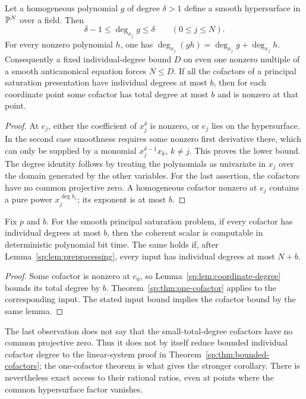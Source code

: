\begin{lemma}
\label{sp:lem:coordinate-degree}
Let a homogeneous polynomial $g$ of degree $\delta>1$ define a smooth
hypersurface in $\mathbb P^N$ over a field. Then
\[
 \delta-1\leq\deg_{x_j}g\leq\delta\qquad(0\leq j\leq N).
\]
For every nonzero polynomial $h$, one has
$\deg_{x_j}(gh)=\deg_{x_j}g+\deg_{x_j}h$.
Consequently a fixed individual-degree bound $D$ on even one nonzero
multiple of a smooth anticanonical equation forces $N\leq D$.
If all the cofactors of a principal saturation presentation have
individual degrees at most $b$, then for each coordinate point some
cofactor has total degree at most $b$ and is nonzero at that point.
\end{lemma}
\begin{proof}
At $e_j$, either the coefficient of $x_j^\delta$ is nonzero, or
$e_j$ lies on the hypersurface. In the second case smoothness requires
some nonzero first derivative there, which can only be supplied by a
monomial $x_j^{\delta-1}x_k$, $k\ne j$. This proves the lower bound.
The degree identity follows by treating the polynomials as univariate
in $x_j$ over the domain generated by the other variables. For the
last assertion, the cofactors have no common projective zero. A
homogeneous cofactor nonzero at $e_j$ contains a pure power
$x_j^{\deg h_i}$; its exponent is at most $b$.
\end{proof}

\begin{corollary}
\label{sp:cor:individual-scalar}
Fix $p$ and $b$. For the smooth principal saturation problem, if every
cofactor has individual degrees at most $b$, then the coherent scalar
is computable in deterministic polynomial bit time. The same holds
if, after Lemma~\ref{sp:lem:preprocessing}, every input has individual
degrees at most $N+b$.
\end{corollary}
\begin{proof}
Some cofactor is nonzero at $e_0$, so
Lemma~\ref{sp:lem:coordinate-degree} bounds its total degree by $b$.
Theorem~\ref{sp:thm:one-cofactor} applies to the corresponding input.
The stated input bound implies the cofactor bound by the same lemma.
\end{proof}

The last observation does not say that the small-total-degree cofactors
have no common projective zero. Thus it does not by itself reduce
bounded individual cofactor degree to the linear-system proof in
Theorem~\ref{sp:thm:bounded-cofactors}; the one-cofactor theorem is
what gives the stronger corollary.
There is nevertheless exact access to their rational ratios, even at
points where the common hypersurface factor vanishes.

